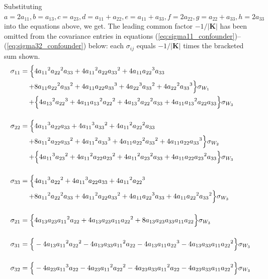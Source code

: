 \documentclass{article}
\begin{document}
Substituting $a=2a_{11}, b=a_{13}, c=a_{23}, d=a_{11}+a_{22}, e=a_{11}+a_{33}, f=2a_{22},g=a_{22}+a_{33}, h=2a_{33}$ into the equations above, we get.
The leading common factor $-1/|\mathbf{K}|$ has been omitted from the
covariance entries in equations
(\ref{eq:sigma11_confounder})--(\ref{eq:sigma32_confounder}) below: each
$\sigma_{ij}$ equals $-1/|\mathbf{K}|$ times the bracketed sum shown.
\begin{align}
\sigma_{11}= \Bigl\{ & 4{a_{11}}^2{a_{22}}^2a_{33}+4{a_{11}}^2a_{22}{a_{33}}^2+4a_{11}{a_{22}}^3a_{33} \nonumber \\
+&8a_{11}{a_{22}}^2{a_{33}}^2+4a_{11}a_{22}{a_{33}}^3+4{a_{22}}^3{a_{33}}^2+4{a_{22}}^2{a_{33}}^3 \Bigr\}\sigma_{W_{1}} \nonumber \\
+&\Bigl\{4{a_{13}}^2{a_{22}}^3+4a_{11}{a_{13}}^2{a_{22}}^2+4{a_{13}}^2{a_{22}}^2a_{33}+4a_{11}{a_{13}}^2a_{22}a_{33}\Bigr\} \sigma_{W_{3}} \label{eq:sigma11_confounder} \\[12pt]
\sigma_{22}= \Bigl\{ & 4{a_{11}}^3a_{22}a_{33}+4{a_{11}}^3{a_{33}}^2+4{a_{11}}^2{a_{22}}^2a_{33} \nonumber \\
+&8{a_{11}}^2a_{22}{a_{33}}^2+4{a_{11}}^2{a_{33}}^3+4a_{11}{a_{22}}^2{a_{33}}^2+4a_{11}a_{22}{a_{33}}^3 \Bigr\}\sigma_{W_{2}} \nonumber \\
+&\Bigl\{4{a_{11}}^3{a_{23}}^2+4{a_{11}}^2a_{22}{a_{23}}^2+4{a_{11}}^2{a_{23}}^2a_{33}+4a_{11}a_{22}{a_{23}}^2a_{33} \Bigr\} \sigma_{W_{3}} \label{eq:sigma22_confounder} \\[12pt]
\sigma_{33}= \Bigl\{ & 4{a_{11}}^3{a_{22}}^2+4{a_{11}}^3a_{22}a_{33}+4{a_{11}}^2{a_{22}}^3 \nonumber \\
+&8{a_{11}}^2{a_{22}}^2a_{33}+4{a_{11}}^2a_{22}{a_{33}}^2+4a_{11}{a_{22}}^3a_{33}+4a_{11}{a_{22}}^2{a_{33}}^2 \Bigr\} \sigma_{W_{3}} \label{eq:sigma33_confounder} \\[12pt]
\sigma_{21}= \Bigl\{ & 4a_{13}a_{23}{a_{11}}^2a_{22}+4a_{13}a_{23}a_{11}{a_{22}}^2+8a_{13}a_{23}a_{33}a_{11}a_{22} \Bigr\} \sigma_{W_{3}} \label{eq:sigma21_confounder} \\[12pt]
\sigma_{31}= \Bigl\{ & -4a_{13}{a_{11}}^2{a_{22}}^2-4a_{13}a_{33}{a_{11}}^2a_{22}-4a_{13}a_{11}{a_{22}}^3-4a_{13}a_{33}a_{11}{a_{22}}^2 \Bigr\} \sigma_{W_{3}} \label{eq:sigma31_confounder} \\[12pt]
\sigma_{32}= \Bigl\{ & -4a_{23}{a_{11}}^3a_{22}-4a_{23}{a_{11}}^2{a_{22}}^2-4a_{23}a_{33}{a_{11}}^2a_{22}-4a_{23}a_{33}a_{11}{a_{22}}^2 \Bigr\} \sigma_{W_{3}} \label{eq:sigma32_confounder}
\end{align}
\end{document}
